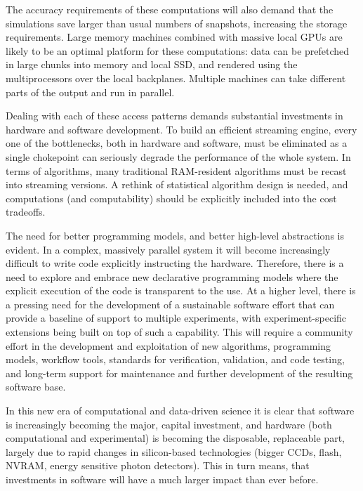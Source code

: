 The accuracy requirements of these
computations will also demand that the simulations save larger than
usual numbers of snapshots, increasing the storage requirements. Large
memory machines combined with massive local GPUs are likely to be an
optimal platform for these computations: data can be prefetched in
large chunks into memory and local SSD, and rendered using the
multiprocessors over the local backplanes. Multiple machines can take
different parts of the output and run in parallel.

Dealing with each of these access patterns demands substantial
investments in hardware and software development. To build an
efficient streaming engine, every one of the bottlenecks, both in
hardware and software, must be eliminated as a single chokepoint can
seriously degrade the performance of the whole system. In terms of
algorithms, many traditional RAM-resident algorithms must be recast
into streaming versions. A rethink of statistical algorithm design is
needed, and computations (and computability) should be explicitly
included into the cost tradeoffs.

The need for better programming models, and better high-level
abstractions is evident. In a complex, massively parallel system it
will become increasingly difficult to write code explicitly
instructing the hardware. Therefore, there is a need to explore and
embrace new declarative programming models where the explicit
execution of the code is transparent to the use. At a higher level,
there is a pressing need for the development of a sustainable software
effort that can provide a baseline of support to multiple experiments,
with experiment-specific extensions being built on top of such a
capability. This will require a community effort in the development
and exploitation of new algorithms, programming models, workflow
tools, standards for verification, validation, and code testing, and
long-term support for maintenance and further development of the
resulting software base.

In this new era of computational and data-driven science it is clear
that software is increasingly becoming the major, capital investment,
and hardware (both computational and experimental) is becoming the
disposable, replaceable part, largely due to rapid changes in
silicon-based technologies (bigger CCDs, flash, NVRAM, energy
sensitive photon detectors).  This in turn means, that investments in
software will have a much larger impact than ever before.

